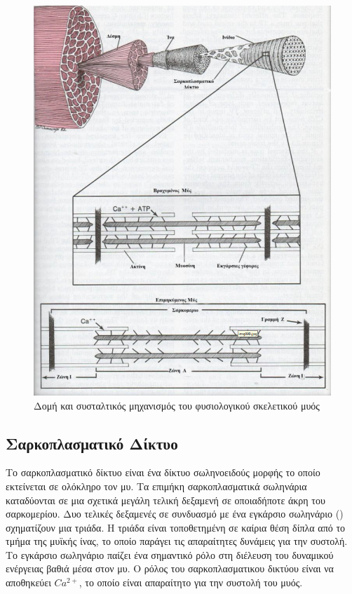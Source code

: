 \begin{figure}[H]
    \centering
    \includegraphics[width=.8\textwidth, height=0.6\textheight, keepaspectratio]{fig/muscle-fysiology2.png}
    \caption{Δομή και συσταλτικός μηχανισμός του φυσιολογικού σκελετικού μυός\protect\footnotemark}
    \label{fig:muscle-fysiology2}
\end{figure}

\subsection{Σαρκοπλασματικό Δίκτυο}

Το σαρκοπλασματικό δίκτυο είναι ένα δίκτυο σωληνοειδούς μορφής το οποίο εκτείνεται σε ολόκληρο τον μυ. Τα επιμήκη σαρκοπλασματικά σωληνάρια καταδύονται σε μια σχετικά μεγάλη τελική δεξαμενή σε οποιαδήποτε άκρη του σαρκομερίου. Δυο τελικές δεξαμενές σε συνδυασμό με ένα εγκάρσιο σωληνάριο () σχηματίζουν μια τριάδα. Η τριάδα είναι τοποθετημένη σε καίρια θέση δίπλα από το τμήμα της μυϊκής ίνας, το οποίο παράγει τις απαραίτητες δυνάμεις για την συστολή. Το εγκάρσιο σωληνάριο παίζει ένα σημαντικό ρόλο στη διέλευση του δυναμικού ενέργειας βαθιά μέσα στον μυ. Ο ρόλος του σαρκοπλασματικου δικτύου είναι να αποθηκεύει $Ca^{2+}$, το οποίο είναι απαραίτητο για την συστολή του μυός.

